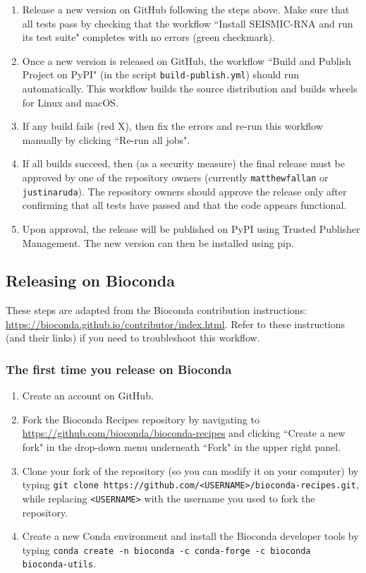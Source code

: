 \documentclass[main.tex]{subfiles}
\begin{document}
\begin{enumerate}
    \item Release a new version on GitHub following the steps above. Make sure that all tests pass by checking that the workflow ``Install SEISMIC-RNA and run its test suite" completes with no errors (green checkmark).
    \item Once a new version is released on GitHub, the workflow ``Build and Publish Project on PyPI" (in the script \verb|build-publish.yml|) should run automatically. This workflow builds the source distribution and builds wheels for Linux and macOS.
    \item If any build fails (red X), then fix the errors and re-run this workflow manually by clicking ``Re-run all jobs".
    \item If all builds succeed, then (as a security measure) the final release must be approved by one of the repository owners (currently \verb|matthewfallan| or \verb|justinaruda|). The repository owners should approve the release only after confirming that all tests have passed and that the code appears functional.
    \item Upon approval, the release will be published on PyPI using Trusted Publisher Management. The new version can then be installed using pip.
\end{enumerate}


\subsection{Releasing on Bioconda}

These steps are adapted from the Bioconda contribution instructions: \url{https://bioconda.github.io/contributor/index.html}.
Refer to these instructions (and their links) if you need to troubleshoot this workflow.

\subsubsection{The first time you release on Bioconda}

\begin{enumerate}
    \item Create an account on GitHub.
    \item Fork the Bioconda Recipes repository by navigating to \url{https://github.com/bioconda/bioconda-recipes} and clicking ``Create a new fork" in the drop-down menu underneath ``Fork" in the upper right panel.
    \item Clone your fork of the repository (so you can modify it on your computer) by typing \verb|git clone https://github.com/<USERNAME>/bioconda-recipes.git|, while replacing \verb|<USERNAME>| with the username you used to fork the repository.
    \item Create a new Conda environment and install the Bioconda developer tools by typing \verb|conda create -n bioconda -c conda-forge -c bioconda bioconda-utils|.
\end{enumerate}
\end{document}
